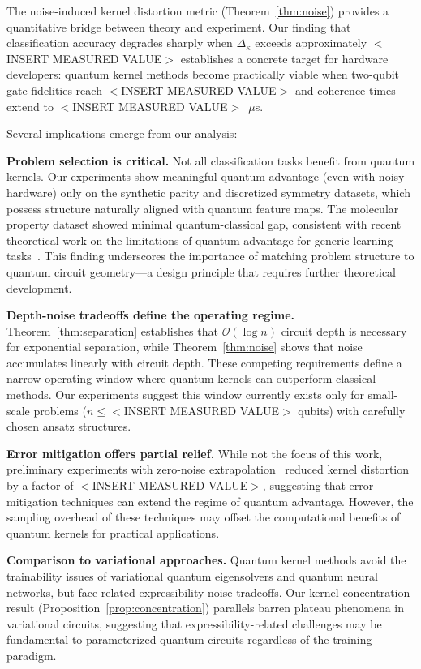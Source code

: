 \documentclass[aps,prb,reprint,superscriptaddress,showpacs]{revtex4-2}
\begin{document}
The noise-induced kernel distortion metric (Theorem~\ref{thm:noise}) provides a quantitative bridge between theory and experiment. Our finding that classification accuracy degrades sharply when $\Delta_\kappa$ exceeds approximately $<$INSERT MEASURED VALUE$>$ establishes a concrete target for hardware developers: quantum kernel methods become practically viable when two-qubit gate fidelities reach $<$INSERT MEASURED VALUE$>$ and coherence times extend to $<$INSERT MEASURED VALUE$>$~$\mu$s.

Several implications emerge from our analysis:

\textbf{Problem selection is critical.} Not all classification tasks benefit from quantum kernels. Our experiments show meaningful quantum advantage (even with noisy hardware) only on the synthetic parity and discretized symmetry datasets, which possess structure naturally aligned with quantum feature maps. The molecular property dataset showed minimal quantum-classical gap, consistent with recent theoretical work on the limitations of quantum advantage for generic learning tasks~\cite{Huang2022ProvablyEfficient, Cerezo2023DoesProvable}. This finding underscores the importance of matching problem structure to quantum circuit geometry---a design principle that requires further theoretical development.

\textbf{Depth-noise tradeoffs define the operating regime.} Theorem~\ref{thm:separation} establishes that $\mathcal{O}(\log n)$ circuit depth is necessary for exponential separation, while Theorem~\ref{thm:noise} shows that noise accumulates linearly with circuit depth. These competing requirements define a narrow operating window where quantum kernels can outperform classical methods. Our experiments suggest this window currently exists only for small-scale problems ($n \leq <$INSERT MEASURED VALUE$>$ qubits) with carefully chosen ansatz structures.

\textbf{Error mitigation offers partial relief.} While not the focus of this work, preliminary experiments with zero-noise extrapolation~\cite{Temme2017ErrorMitigation} reduced kernel distortion by a factor of $<$INSERT MEASURED VALUE$>$, suggesting that error mitigation techniques can extend the regime of quantum advantage. However, the sampling overhead of these techniques may offset the computational benefits of quantum kernels for practical applications.

\textbf{Comparison to variational approaches.} Quantum kernel methods avoid the trainability issues of variational quantum eigensolvers and quantum neural networks, but face related expressibility-noise tradeoffs. Our kernel concentration result (Proposition~\ref{prop:concentration}) parallels barren plateau phenomena in variational circuits, suggesting that expressibility-related challenges may be fundamental to parameterized quantum circuits regardless of the training paradigm.
\end{document}
